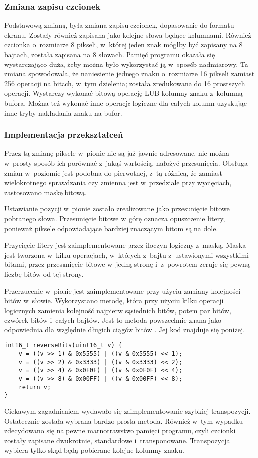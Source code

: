 \subsubsection*{Zmiana zapisu czcionek}
Podstawową zmianą, była zmiana zapisu czcionek, dopasowanie do formatu ekranu. Zostały również zapisana jako kolejne słowa będące kolumnami. Również czcionka o~rozmiarze 8 pikseli, w~której jeden znak mógłby być zapisany na 8 bajtach, została zapisana na 8 słowach. Pamięć programu okazała się wystarczająco duża, żeby można było wykorzystać ją w~sposób nadmiarowy. Ta zmiana spowodowała, że naniesienie jednego znaku o~rozmiarze 16 pikseli zamiast 256 operacji na bitach, w~tym dzielenia; została zredukowana do 16 prostszych operacji. Wystarczy wykonać bitową operację LUB kolumny znaku z~kolumną bufora. Można też wykonać inne operacje logiczne dla całych kolumn uzyskując inne tryby nakładania znaku na bufor.

\subsubsection*{Implementacja przekształceń}
Przez tą zmianę piksele w~pionie nie są już jawnie adresowane, nie można w~prosty sposób ich porównać z~jakąś wartością, nałożyć przesunięcia. Obsługa zmian w~poziomie jest podobna do pierwotnej, z~tą różnicą, że zamiast wielokrotnego sprawdzania czy zmienna jest w~przedziale przy wycięciach, zastosowano maskę bitową.

Ustawianie pozycji w~pionie zostało zrealizowane jako przesunięcie bitowe pobranego słowa. Przesunięcie bitowe w~górę oznacza opuszczenie litery, ponieważ piksele odpowiadające bardziej znaczącym bitom są na dole. 

Przycięcie litery jest zaimplementowane przez iloczyn logiczny z~maską. Maska jest tworzona w~kilku operacjach, w~których z~bajtu z~ustawionymi wszystkimi bitami, przez przesunięcie bitowe w~jedną stronę i~z~powrotem zeruje się pewną liczbę bitów od tej strony.

Przerzucenie w~pionie jest zaimplementowane przy użyciu zamiany kolejności bitów w~słowie. Wykorzystano metodę, która przy użyciu kilku operacji logicznych zamienia kolejność najpierw sąsiednich bitów, potem par bitów, czwórek bitów i~całych bajtów. Jest to metoda powszechnie znana jako odpowiednia dla względnie długich ciągów bitów \cite{reverse-bits}. Jej kod znajduje się poniżej.

\begin{verbatim}
int16_t reverseBits(uint16_t v) {
    v = ((v >> 1) & 0x5555) | ((v & 0x5555) << 1);
    v = ((v >> 2) & 0x3333) | ((v & 0x3333) << 2);
    v = ((v >> 4) & 0x0F0F) | ((v & 0x0F0F) << 4);
    v = ((v >> 8) & 0x00FF) | ((v & 0x00FF) << 8);
    return v;
}
\end{verbatim}

Ciekawym zagadnieniem wydawało się zaimplementowanie szybkiej transpozycji. Ostatecznie została wybrana bardzo prosta metoda. Również w~tym wypadku zdecydowano się na pewne marnotrawstwo pamięci programu, czyli czcionki zostały zapisane dwukrotnie, standardowe i~transponowane. Transpozycja wybiera tylko skąd będą pobierane kolejne kolumny znaku.
